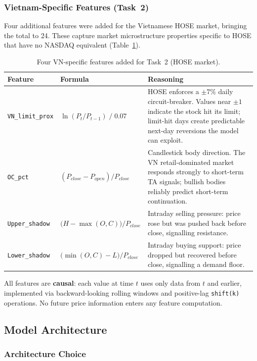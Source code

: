 \documentclass[12pt, a4paper]{article}
\begin{document}
\subsubsection{Vietnam-Specific Features (Task~2)}
\label{sec:vn_features}

Four additional features were added for the Vietnamese HOSE market, bringing 
the total to 24. These capture market microstructure properties specific to 
HOSE that have no NASDAQ equivalent (Table~\ref{tab:vn_features}).

\begin{table}[h]
\centering
\caption{Four VN-specific features added for Task~2 (HOSE market).}
\label{tab:vn_features}
\renewcommand{\arraystretch}{1.3}
\begin{tabular}{lp{4cm}p{6cm}}
\hline
\textbf{Feature} & \textbf{Formula} & \textbf{Reasoning} \\
\hline
\texttt{VN\_limit\_prox} 
  & $\ln(P_t/P_{t-1}) \;/\; 0.07$
  & HOSE enforces a $\pm7\%$ daily circuit-breaker. Values near $\pm1$ indicate 
    the stock hit its limit; limit-hit days create predictable next-day 
    reversions the model can exploit. \\
\hline
\texttt{OC\_pct} 
  & $(P_{close} - P_{open}) / P_{close}$
  & Candlestick body direction. The VN retail-dominated market responds strongly 
    to short-term TA signals; bullish bodies reliably predict short-term 
    continuation. \\
\hline
\texttt{Upper\_shadow} 
  & $\bigl(H - \max(O,C)\bigr) / P_{close}$
  & Intraday selling pressure: price rose but was pushed back before close, 
    signalling resistance. \\
\hline
\texttt{Lower\_shadow} 
  & $\bigl(\min(O,C) - L\bigr) / P_{close}$
  & Intraday buying support: price dropped but recovered before close, 
    signalling a demand floor. \\
\hline
\end{tabular}
\end{table}

All features are \textbf{causal}: each value at time $t$ uses only data from 
$t$ and earlier, implemented via backward-looking rolling windows and 
positive-lag \texttt{shift(k)} operations. No future price information enters 
any feature computation.
\subsection{Model Architecture}

\subsubsection{Architecture Choice}
\label{sec:arch}
\end{document}
